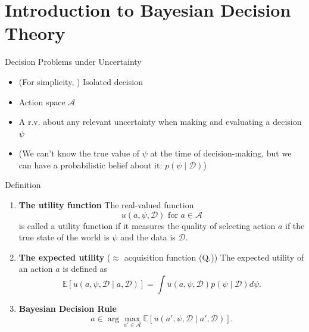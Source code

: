 \documentclass[9pt]{beamer}
\begin{document}
\section{Introduction to Bayesian Decision Theory}
\begin{frame}{Decision Problems under Uncertainty}
  \small{\begin{itemize}
    \item (For simplicity, ) Isolated decision
    \vspace{0.8em}
    \item Action space $\mathcal{A}$
    \item A r.v. about any relevant uncertainty when making and evaluating a decision $\psi$
    \item[] (We can't know the true value of $\psi$ at the time of decision-making, 
    but we can have a probabilistic belief about it: $p(\psi \mid \mathcal{D})$)
  \end{itemize}

  \begin{block}{Definition}
    \begin{enumerate}
      \item \textbf{The utility function}
      \newline
      The real-valued function
      \[
        u(a, \psi, \mathcal{D}) \text{ for } a \in \mathcal{A}
      \]
      is called a utility function if it measures the quality of selecting action $a$ 
      if the true state of the world is $\psi$ and the data is $\mathcal{D}$.

      \item \textbf{The expected utility} ($\approx$ acquisition function (Q.))
      \newline
      The expected utility of an action $a$ is defined as
      \[
        \mathbb{E}\left[u(a, \psi, \mathcal{D} \mid a, \mathcal{D})\right] = \int u(a, \psi, \mathcal{D}) p(\psi \mid \mathcal{D}) d\psi.
      \]

      \item \textbf{Bayesian Decision Rule}
      \newline
      \[
        a \in \arg\max_{a' \in \mathcal{A}} \mathbb{E}\left[u(a', \psi, \mathcal{D} \mid a', \mathcal{D})\right].
      \]
    \end{enumerate}
  \end{block}}
\end{frame}
\end{document}
